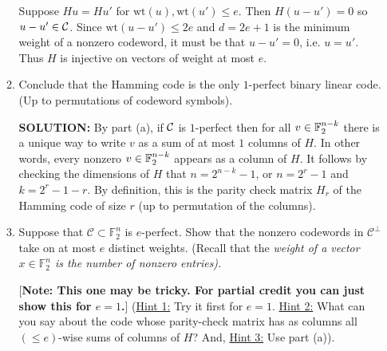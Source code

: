 \documentclass{article}
\newcommand{\cC}{\mathcal{C}}
\newcommand{\F}{\mathbb{F}}
\begin{document}
\begin{enumerate}
\begin{enumerate}
\begin{shaded}
Suppose $Hu = Hu'$ for $\text{wt}(u), \text{wt}(u') \leq e$. Then $H(u - u') = 0$ so $u - u' \in \mathcal{C}$. Since $\text{wt}(u - u') \leq 2e$ and $d = 2e+1$ is the minimum weight of a nonzero codeword, it must be that $u - u' = 0$, i.e. $u = u'$. Thus $H$ is injective on vectors of weight at most $e$.
\end{shaded}


	\item Conclude that the Hamming code is the only $1$-perfect binary linear code.  (Up to permutations of codeword symbols).

\begin{shaded}
\textbf{SOLUTION:}
By part (a), if $\mathcal{C}$ is $1$-perfect then for all $v \in \mathbb{F}_2^{n-k}$ there is a unique way to write $v$ as a sum of at most $1$ columns of $H$. In other words, every nonzero $v \in \mathbb{F}_2^{n-k}$ appears as a column of $H$. It follows by checking the dimensions of $H$ that $n = 2^{n-k}-1$, or $n = 2^r - 1$ and $k = 2^r - 1 - r$. By definition, this is the parity check matrix $H_r$ of the Hamming code of size $r$ (up to permutation of the columns).
\end{shaded}

	\item 
Suppose that $\cC \subset \F_2^n$ is $e$-perfect.  Show that the nonzero codewords in $\cC^\perp$ take on at most $e$ distinct weights.  (Recall that the \em weight \em of a vector $x \in \F_2^n$ is the number of nonzero entries).

[\textbf{Note: This one may be tricky. For partial credit you can just show this for $e=1$.}]
(\underline{Hint 1:} Try it first for $e=1$.  \underline{Hint 2:} What can you say about the code 
whose parity-check matrix has as columns all $(\leq e)$-wise sums of columns of $H$?  And, \underline{Hint 3:} Use part (a)).


\end{enumerate}
\end{enumerate}
\end{document}
